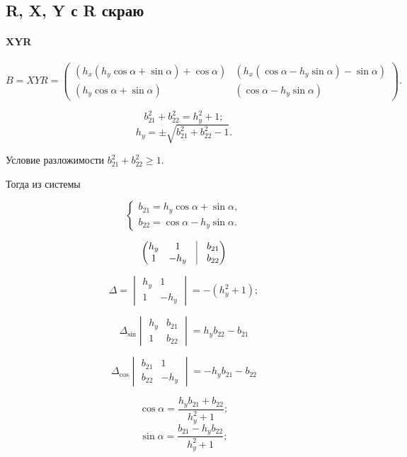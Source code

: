 \subsection{R, X, Y с R скраю}

\paragraph{XYR}


$$B = XYR =
\begin{pmatrix}
	\left( {h_x} \left( {h_y} \cos{\alpha} + \sin{\alpha}\right) + \cos{\alpha}\right) & 
	\left( {h_x} \left( \cos{\alpha} - {h_y}\sin{\alpha} \right) - \sin{\alpha}\right) \\
	\left( {h_y} \cos{\alpha} + \sin{\alpha}\right) & 
	\left( \cos{\alpha} - {h_y} \sin{\alpha}\right)
\end{pmatrix}.
$$

$$b_{21}^2 + b_{22}^2 = h_y^2 + 1;$$
$$h_y = \pm \sqrt{b_{21}^2 + b_{22}^2 - 1}.$$

Условие разложимости $b_{21}^2 + b_{22}^2 \ge 1$.

Тогда из системы

$$
\begin{cases}
	b_{21} = {h_y} \cos{\alpha} + \sin{\alpha},\\
	b_{22} = \cos{\alpha} - {h_y} \sin{\alpha}.
\end{cases}
$$

$$\begin{pmatrix}
	h_y & 1 & \vrule & b_{21} \\
	1 & -h_y & \vrule  & b_{22}
\end{pmatrix}$$

$$\Delta = \begin{vmatrix}
	h_y & 1\\
	1 & -h_y
\end{vmatrix} = - (h_y^2 + 1);$$

$$\Delta_{\sin}\begin{vmatrix}
	h_y & b_{21}\\
	1 &   b_{22}
\end{vmatrix} = h_y b_{22} - b_{21}$$

$$\Delta_{\cos}\begin{vmatrix}
	b_{21} & 1\\
	b_{22} & -h_y
\end{vmatrix} = -h_y b_{21} - b_{22}$$

$$\cos\alpha = \frac{h_y b_{21} + b_{22}}{h_y^2 + 1};$$
$$\sin\alpha = \frac{b_{21} - h_y b_{22}}{h_y^2 + 1};$$

